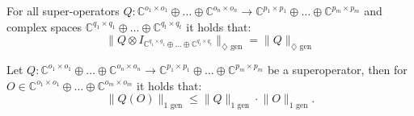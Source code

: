 \begin{corollary} \label{cor:tensor_stability}
  For all super-operators  $Q: \mathbb{C}^{o_1 \times o_1} \oplus \ldots \oplus \mathbb{C}^{o_n \times o_n}  \rightarrow \mathbb{C}^{p_1 \times p_1} \oplus \ldots \oplus  \mathbb{C}^{p_m \times p_m}$ and complex spaces $\mathbb{C}^{q_1 \times q_1} \oplus \ldots \oplus \mathbb{C}^{q_t \times q_t}$   it holds that:
\begin{equation}
   \lVert Q \otimes I_{\mathbb{C}^{q_1 \times q_1} \oplus \ldots \oplus \mathbb{C}^{q_t \times q_t}} \rVert_{\diamondsuit \text{ gen}} = \lVert Q \rVert_{\diamondsuit \text{ gen}} 
\end{equation}
\end{corollary}

\begin{lemma}\label{lem:q(o)}
  Let  $Q: \mathbb{C}^{o_1 \times o_1} \oplus \ldots \oplus \mathbb{C}^{o_n \times o_n}  \rightarrow \mathbb{C}^{p_1 \times p_1} \oplus \ldots \oplus  \mathbb{C}^{p_m \times p_m}$ be a superoperator, then for $O \in \mathbb{C}^{o_1 \times o_1} \oplus \ldots \oplus  \mathbb{C}^{o_m \times o_m}$ it holds that:
  \begin{equation} \label{eq:qo<q}
    \lVert Q(O) \rVert_{1 \text{ gen}} \leq \lVert Q  \rVert_{1 \text{ gen}} \cdot \lVert O  \rVert_{1 \text{ gen}}.
  \end{equation}
\end{lemma}

